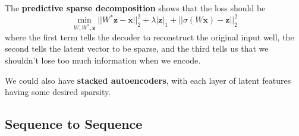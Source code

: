     The \textbf{predictive sparse decomposition} shows that the loss should be 
    \begin{equation}
      \min_{W, W^\ast, \mathbf{z}} ||W^\ast \mathbf{z} - \mathbf{x}||^2_2 + \lambda | \mathbf{z}|_1 + ||\sigma(W \mathbf{x}) - \mathbf{z}||^2_2
    \end{equation}
    where the first term tells the decoder to reconstruct the original input well, the second tells the latent vector to be sparse, and the third tells us that we shouldn't lose too much information when we encode. 

    We could also have \textbf{stacked autoencoders}, with each layer of latent features having some desired sparsity. 

  \subsection{Sequence to Sequence}

